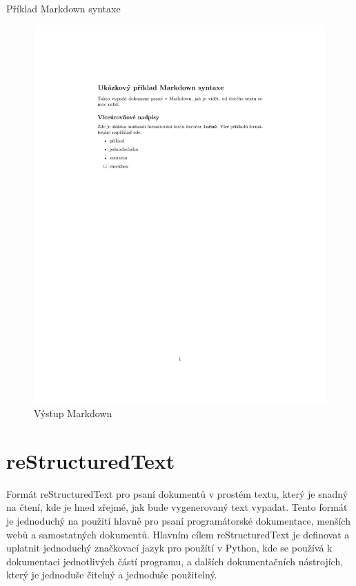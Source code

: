 \begin{listing}[ht]
    \inputminted[linenos,breaklines]{md}{example.md}
    \caption{Příklad Markdown syntaxe}
    \label{lst:markdown}
\end{listing}

\begin{figure}[h]
    \centering
    \includegraphics[width=\textwidth]{example.pdf}
    \caption{Výstup Markdown}
    \label{fig:markdown}
\end{figure}

\clearpage

\section{reStructuredText}

Formát reStructuredText pro psaní dokumentů v prostém textu, který je snadný na čtení, kde je hned zřejmé, jak bude vygenerovaný text vypadat.
Tento formát je jednoduchý na použití hlavně pro psaní programátorské dokumentace, menších webů a samostatných dokumentů.
Hlavním cílem reStructuredText je definovat a uplatnit jednoduchý značkovací jazyk pro použítí v Python, kde se používá k dokumentaci jednotlivých částí programu,
a dalších dokumentačních nástrojích, který je jednoduše čitelný a jednoduše použitelný. \cite{reStruDoc}

